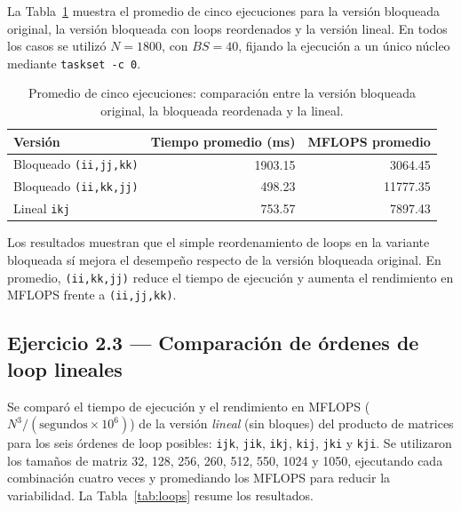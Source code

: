 \documentclass[11pt,a4paper]{article}
\begin{document}
La Tabla~\ref{tab:comparacion_tres} muestra el promedio de cinco ejecuciones para la versión bloqueada original, la versión bloqueada con loops reordenados y la versión lineal. En todos los casos se utilizó \(N=1800\), con \(BS=40\), fijando la ejecución a un único núcleo mediante \texttt{taskset -c 0}.

\begin{table}[ht]
\centering
\caption{Promedio de cinco ejecuciones: comparación entre la versión bloqueada original, la bloqueada reordenada y la lineal.}
\label{tab:comparacion_tres}
\begin{tabular}{|l|r|r|}
\hline
Versión & Tiempo promedio (ms) & MFLOPS promedio \\ \hline
Bloqueado \texttt{(ii,jj,kk)} & 1903.15 & 3064.45 \\ \hline
Bloqueado \texttt{(ii,kk,jj)} & 498.23 & 11777.35 \\ \hline
Lineal \texttt{ikj} & 753.57 & 7897.43 \\ \hline
\end{tabular}
\end{table}

Los resultados muestran que el simple reordenamiento de loops en la variante bloqueada sí mejora el desempeño respecto de la versión bloqueada original. En promedio, \texttt{(ii,kk,jj)} reduce el tiempo de ejecución y aumenta el rendimiento en MFLOPS frente a \texttt{(ii,jj,kk)}.

\subsection*{Ejercicio 2.3 --- Comparación de órdenes de loop lineales}

Se comparó el tiempo de ejecución y el rendimiento en MFLOPS (\(N^3 / (\text{segundos} \times 10^6)\)) de la versión \emph{lineal} (sin bloques) del producto de matrices para los seis órdenes de loop posibles: \texttt{ijk}, \texttt{jik}, \texttt{ikj}, \texttt{kij}, \texttt{jki} y \texttt{kji}. Se utilizaron los tamaños de matriz 32, 128, 256, 260, 512, 550, 1024 y 1050, ejecutando cada combinación cuatro veces y promediando los MFLOPS para reducir la variabilidad. La Tabla~\ref{tab:loops} resume los resultados.
\end{document}
